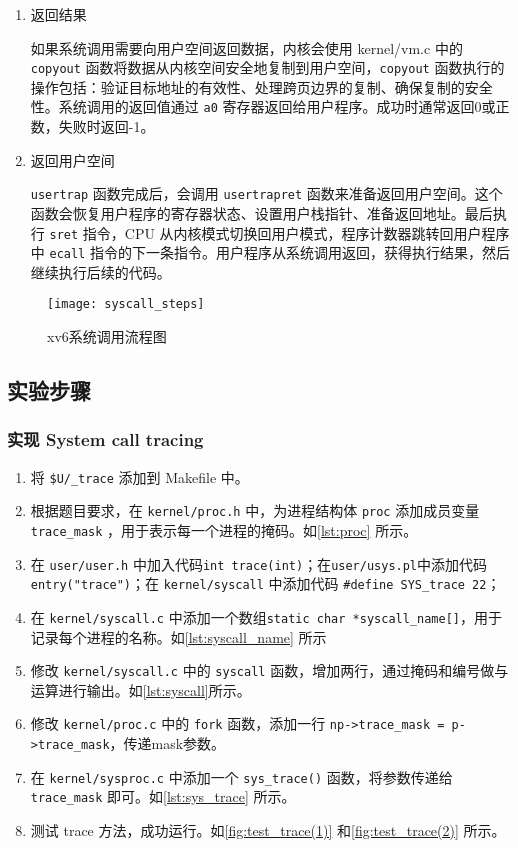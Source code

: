 \begin{enumerate}
	\item 返回结果
	
	如果系统调用需要向用户空间返回数据，内核会使用 kernel/vm.c 中的 \texttt{copyout} 函数将数据从内核空间安全地复制到用户空间，\texttt{copyout} 函数执行的操作包括：验证目标地址的有效性、处理跨页边界的复制、确保复制的安全性。系统调用的返回值通过 \texttt{a0} 寄存器返回给用户程序。成功时通常返回0或正数，失败时返回-1。
	
	\item 返回用户空间
	
	\texttt{usertrap} 函数完成后，会调用 \texttt{usertrapret} 函数来准备返回用户空间。这个函数会恢复用户程序的寄存器状态、设置用户栈指针、准备返回地址。最后执行 \texttt{sret} 指令，CPU 从内核模式切换回用户模式，程序计数器跳转回用户程序中 \texttt{ecall} 指令的下一条指令。用户程序从系统调用返回，获得执行结果，然后继续执行后续的代码。
\end{enumerate}

\begin{figure}[!htb]
	\centering
	\texttt{[image: syscall\_steps]}
	\caption{xv6系统调用流程图}
	\label{fig:syscall_steps}
\end{figure}

\subsection{实验步骤}

\subsubsection{实现 System call tracing}

\begin{enumerate}
	\item 将 \texttt{\$U/\_trace} 添加到 Makefile 中。
	\item 根据题目要求，在 \texttt{kernel/proc.h} 中，为进程结构体 \texttt{proc} 添加成员变量 \texttt{trace\_mask} ，用于表示每一个进程的掩码。如\cref{lst:proc} 所示。
	\item 在 \texttt{user/user.h} 中加入代码\texttt{int trace(int)}；在\texttt{user/usys.pl}中添加代码\texttt{entry("trace")}；在 \texttt{kernel/syscall} 中添加代码 \texttt{\#define SYS\_trace 22}；
	\item 在 \texttt{kernel/syscall.c} 中添加一个数组\texttt{static char *syscall\_name[]}，用于记录每个进程的名称。如\cref{lst:syscall_name} 所示
	\item 修改 \texttt{kernel/syscall.c} 中的 \texttt{syscall} 函数，增加两行，通过掩码和编号做与运算进行输出。如\cref{lst:syscall}所示。
	\item 修改 \texttt{kernel/proc.c} 中的 \texttt{fork} 函数，添加一行 \texttt{np->trace\_mask = p->trace\_mask}，传递mask参数。
	\item 在 \texttt{kernel/sysproc.c} 中添加一个 \texttt{sys\_trace()} 函数，将参数传递给 \texttt{trace\_mask} 即可。如\cref{lst:sys_trace} 所示。
	\item 测试 trace 方法，成功运行。如\cref{fig:test_trace(1)} 和\cref{fig:test_trace(2)} 所示。
\end{enumerate}

